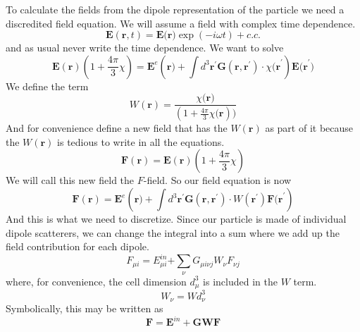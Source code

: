 \documentclass{article}
\begin{document}
To calculate the fields from the dipole representation of the particle we
need a discredited field equation. We will assume a field with complex time
dependence.%
\begin{equation}
\mathbf{E}\left( \mathbf{r},t\right) =\mathbf{E(r})\exp (-i\omega t)+c.c.
\label{Field}
\end{equation}%
and as usual never write the time dependence. We want to solve%
\begin{equation}
\mathbf{E}(\mathbf{r})(1+\frac{4\pi }{3}\chi )=\mathbf{E}^{e}(\mathbf{r)+}%
\int d^{3}\mathbf{r}^{\prime }\mathbf{G}\left( \mathbf{r},\mathbf{r}^{\prime
}\right) \cdot \chi \mathbf{(r}^{\prime })\mathbf{E(r}^{\prime })
\end{equation}%
We define the term%
\begin{equation}
W\left( \mathbf{r}\right) =\frac{\chi \mathbf{(r})}{(1+\frac{4\pi }{3}\chi 
\mathbf{(r}))}  \label{W1}
\end{equation}%
And for convenience define a new field that has the $W\left( \mathbf{r}%
\right) $ as part of it because the $W\left( \mathbf{r}\right) $ is tedious
to write in all the equations.  
\begin{equation*}
\mathbf{F}(\mathbf{r})=\mathbf{E}(\mathbf{r})(1+\frac{4\pi }{3}\chi )
\end{equation*}%
We will call this new field the $F$-field. So our field equation is now 
\begin{equation}
\mathbf{F}(\mathbf{r})=\mathbf{E}^{e}(\mathbf{r)+}\int d^{3}\mathbf{r}%
^{\prime }\mathbf{G}\left( \mathbf{r},\mathbf{r}^{\prime }\right) \cdot
W\left( \mathbf{r}^{\prime }\right) \mathbf{F(r}^{\prime })  \label{F-field}
\end{equation}%
And this is what we need to discretize. Since our particle is made of
individual dipole scatterers, we can change the integral into a sum where we
add up the field contribution for each dipole. 
\begin{equation}
F_{\mu i}=E_{\mu i}^{in}\mathbf{+}\sum\limits_{\nu }G_{\mu i\nu j}W_{\nu
}F_{\nu j}  \label{AlgF}
\end{equation}%
where, for convenience, the cell dimension $d_{\mu }^{3}$ is included in the 
$W$ term. 
\begin{equation}
W_{\nu }=Wd_{\nu }^{3}
\end{equation}%
Symbolically, this may be written as 
\begin{equation}
\mathbf{F}=\mathbf{E}^{in}+\mathbf{GWF}
\end{equation}
\end{document}
